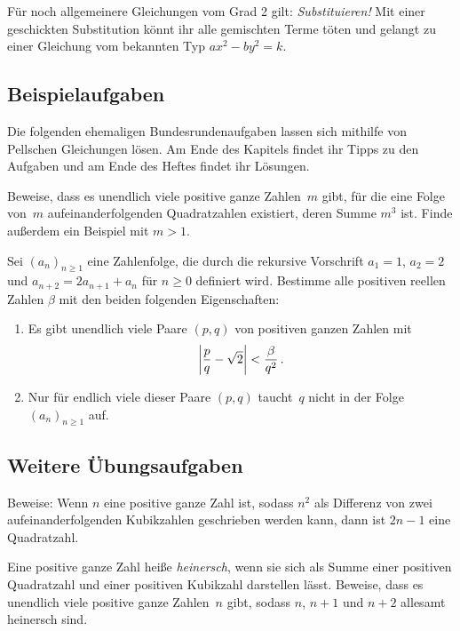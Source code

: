 Für noch allgemeinere Gleichungen vom Grad 2 gilt: \emph{Substituieren!} Mit einer geschickten Substitution könnt ihr alle gemischten Terme töten und gelangt zu einer Gleichung vom bekannten Typ $ax^2-by^2=k$.

\subsection*{Beispielaufgaben}
Die folgenden ehemaligen Bundesrundenaufgaben lassen sich mithilfe von Pellschen Gleichungen lösen. Am Ende des Kapitels findet ihr Tipps zu den Aufgaben und am Ende des Heftes findet ihr Lösungen.
\begin{aufgabe*}\label{aufgabe:561246}
	Beweise, dass es unendlich viele positive ganze Zahlen~$m$ gibt, für die eine Folge von~$m$ aufeinanderfolgenden Quadratzahlen existiert, deren Summe $m^3$ ist. Finde außerdem ein Beispiel mit $m>1$.
\end{aufgabe*}
\begin{aufgabe*}[***]\label{aufgabe:521246}
	Sei $(a_n)_{n\geqslant 1}$ eine Zahlenfolge, die durch die rekursive Vorschrift $a_1=1$, $a_2=2$ und $a_{n+2}=2a_{n+1}+a_n$ für $n\geqslant 0$ definiert wird. Bestimme alle positiven reellen Zahlen $\beta$ mit den beiden folgenden Eigenschaften:
	\begin{enumerate}[label={$(\Alph*)$},ref={$(\Alph*)$}]
		\item Es gibt unendlich viele Paare $(p,q)$ von positiven ganzen Zahlen mit\label{bedingung:RationaleApproximation}
		\begin{equation*}
			\abs*{\frac pq-\sqrt{2}}<\frac{\beta}{q^2}\,.
		\end{equation*}
		\item Nur für endlich viele dieser Paare $(p,q)$ taucht~$q$ nicht in der Folge $(a_n)_{n\geqslant 1}$ auf.\label{bedingung:NurEndlichVieleNichtInDerFolge}
	\end{enumerate}
\end{aufgabe*}

\subsection*{Weitere Übungsaufgaben}
\begin{aufgabe*}
	Beweise: Wenn $n$ eine positive ganze Zahl ist, sodass $n^2$ als Differenz von zwei aufeinanderfolgenden Kubikzahlen geschrieben werden kann, dann ist $2n-1$ eine Quadratzahl.
\end{aufgabe*}
\begin{aufgabe*}
	Eine positive ganze Zahl heiße \emph{heinersch}, wenn sie sich als Summe einer positiven Quadratzahl und einer positiven Kubikzahl darstellen lässt. Beweise, dass es unendlich viele positive ganze Zahlen~$n$ gibt, sodass $n$, $n+1$ und $n+2$ allesamt heinersch sind. 
\end{aufgabe*}

